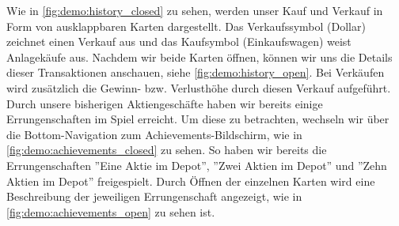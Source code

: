 \documentclass[a4paper]{article}
\begin{document}
Wie in \autoref{fig:demo:history_closed} zu sehen, werden unser Kauf und Verkauf in Form von ausklappbaren Karten dargestellt. Das Verkaufssymbol (Dollar) zeichnet einen Verkauf aus und das Kaufsymbol (Einkaufswagen) weist Anlagekäufe aus. Nachdem wir beide Karten öffnen, können wir uns die Details dieser Transaktionen anschauen, siehe \autoref{fig:demo:history_open}. Bei Verkäufen wird zusätzlich die Gewinn- bzw. Verlusthöhe durch diesen Verkauf aufgeführt.\newline
Durch unsere bisherigen Aktiengeschäfte haben wir bereits einige Errungenschaften im Spiel erreicht. Um diese zu betrachten, wechseln wir über die Bottom-Navigation zum Achievements-Bildschirm, wie in \autoref{fig:demo:achievements_closed} zu sehen. So haben wir bereits die Errungenschaften ''Eine Aktie im Depot'', ''Zwei Aktien im Depot'' und ''Zehn Aktien im Depot'' freigespielt. Durch Öffnen der einzelnen Karten wird eine Beschreibung der jeweiligen Errungenschaft angezeigt, wie in  \autoref{fig:demo:achievements_open} zu sehen ist.
\end{document}
